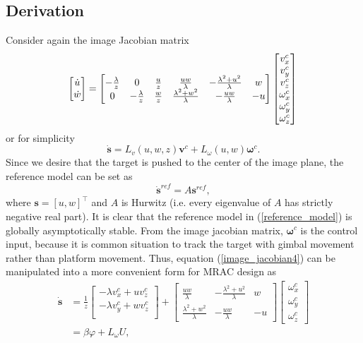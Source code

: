\subsection{Derivation}
Consider again the image Jacobian matrix
\begin{equation}
\begin{bmatrix}
\dot{u} \\ \dot{w}
\end{bmatrix}
=\begin{bmatrix}
-\frac{\lambda}{z} & 0 & \frac{u}{z} & \frac{uw}{\lambda} & -\frac{\lambda^2+u^2}{\lambda} & w \\
0 & -\frac{\lambda}{z} & \frac{w}{z} & \frac{\lambda^2+w^2}{\lambda} & -\frac{uw}{\lambda} & -u
\end{bmatrix}
\begin{bmatrix}
v_x^c \\ v_y^c \\ v_z^c \\
\omega_x^c \\ \omega_y^c \\ \omega_z^c
\end{bmatrix}\\
\label{image_jacobian4}
\end{equation}
or for simplicity
\begin{equation}
\mathbf{\dot{s}}=L_v(u,w,z)\mathbf{v}^c+L_{\omega}(u,w)\mathbf{\omega}^c.
\end{equation}
Since we desire that the target is pushed to the center of the image plane, the reference model can be set as 
\begin{equation}
\mathbf{\dot{s}}^{ref}=A\mathbf{s}^{ref},
\label{reference_model}
\end{equation}
where $\mathbf{s}=[u, w]^\top$ and $A$ is Hurwitz (i.e. every eigenvalue of $A$ has strictly negative real part). It is clear that the reference model in (\ref{reference_model}) is globally asymptotically stable. From the image jacobian matrix, $\mathbf{\omega}^c$ is the control input, because it is common situation to track the target with gimbal movement rather than platform movement. Thus, equation (\ref{image_jacobian4}) can be manipulated into a more convenient form for MRAC design as 
\begin{align}
\mathbf{\dot{s}}
&=\frac{1}{z}
\begin{bmatrix}
-\lambda v_x^c+uv_z^c \\
-\lambda v_y^c+wv_z^c \\
\end{bmatrix}
+\begin{bmatrix}
\frac{uw}{\lambda} & -\frac{\lambda^2+u^2}{\lambda} & w \\
\frac{\lambda^2+w^2}{\lambda} & -\frac{uw}{\lambda} & -u
\end{bmatrix}
\begin{bmatrix}
\omega_x^c \\ \omega_y^c \\ \omega_z^c
\end{bmatrix}
\\&=\beta\varphi + L_{\omega}U,
\label{adaptive_image_jacobian}
\end{align}
